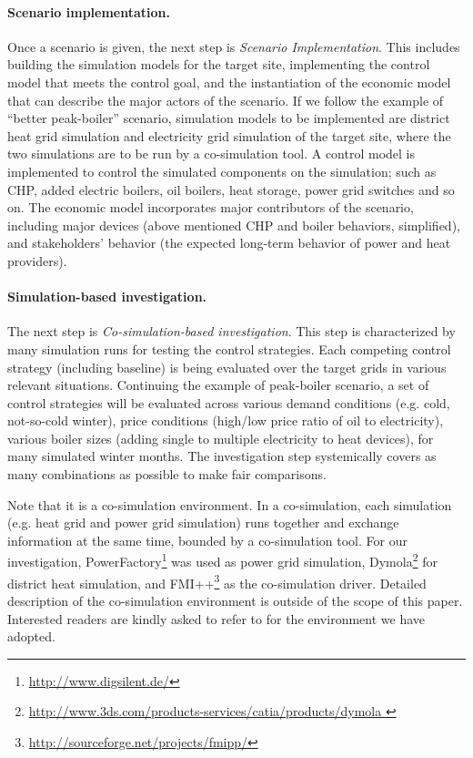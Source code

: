 \documentclass[a4paper,twoside]{article}
\begin{document}
\paragraph{Scenario implementation.} 
\noindent
Once a scenario is given, the next step is {\em Scenario
  Implementation}. This includes building the simulation models 
for the target site, implementing the control model that meets the
control goal, and the instantiation of the economic model that can
describe the major actors of the scenario. 
If we follow the example of  ``better peak-boiler'' scenario,
simulation models to be implemented are district heat grid simulation
and electricity grid simulation of the target site, where the two
simulations are to be run by a co-simulation tool. A control model is
implemented to control the simulated components on the simulation;
such as CHP, added electric boilers, oil boilers, heat storage, power
grid switches and so on. The economic model incorporates major
contributors of the scenario, including major devices (above mentioned
CHP and boiler behaviors, simplified), and stakeholders' behavior (the
expected long-term behavior of power and heat providers). 

\paragraph{Simulation-based investigation.} 
\noindent
The next step is {\em Co-simulation-based investigation}. 
This step is characterized by many simulation runs for testing the
control strategies. 
Each competing control strategy (including baseline) is being
evaluated over the target grids in various relevant situations. 
Continuing the example of peak-boiler scenario, a set
of control strategies will be evaluated across various demand
conditions (e.g. cold, not-so-cold winter), price conditions (high/low
price ratio of oil to electricity), various boiler sizes (adding
single to multiple electricity to heat devices), for many simulated
winter months. The investigation step systemically covers as many 
combinations as possible to make fair comparisons.   

Note that it is a co-simulation environment. In a co-simulation, each
simulation (e.g. heat grid and power grid simulation) runs together
and exchange information at the same time, bounded by a co-simulation
tool. 
For our investigation,
PowerFactory\footnote{\url{http://www.digsilent.de/}} was used as
power grid simulation, Dymola\footnote{\url{http://www.3ds.com/products-services/catia/products/dymola
 }} for district heat simulation, and  FMI++\footnote{\url{http://sourceforge.net/projects/fmipp/}} as the 
co-simulation driver.  
Detailed description of the co-simulation environment is outside of
the scope of this paper. Interested readers are kindly asked to refer
to \cite{Widl_2015} for the environment we have adopted. 
\end{document}
